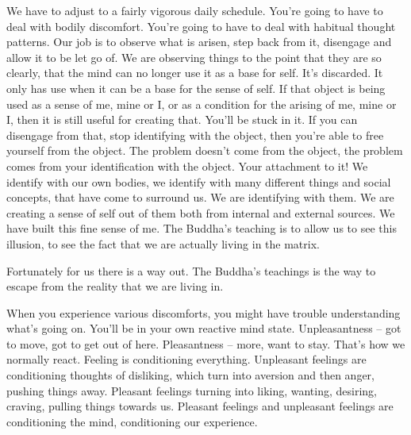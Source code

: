 \documentclass[letterpaper,10pt,english]{sphinxmanual}
\begin{document}
\sphinxAtStartPar
We  have  to  adjust  to  a  fairly  vigorous  daily  schedule.  You’re  going
to  have  to  deal  with  bodily  discomfort. You’re  going  to  have  to  deal  with
habitual  thought  patterns.  Our  job  is  to  observe  what  is  arisen,  step  back
from it, disengage and allow it to be let go of. We are observing things to the
point that they are so clearly, that the mind can no longer use it as a base for
self. It’s discarded. It only has use when it can be a base for the sense of self.
If that object is being used as a sense of me, mine or I, or as a condition for
the arising of me, mine or I, then it is still useful for creating that. You’ll be
stuck in it. If you can disengage from that, stop identifying with the object,
then you’re able to free yourself from the object. The problem doesn’t come
from the object, the problem comes from your identification with the object.
Your  attachment  to  it! We  identify  with  our  own  bodies,  we  identify  with
many different things and social concepts, that have come to surround us.
We are identifying with them. We are creating a sense of self out of them
both from internal and external sources. We have built this fine sense of me.
The Buddha’s teaching is to allow us to see this illusion, to see the fact that
we are actually living in the matrix.

\sphinxAtStartPar
Fortunately  for  us  there  is  a  way  out. The  Buddha’s  teachings  is  the
way to escape from the reality that we are living in.

\sphinxAtStartPar
When  you  experience  various  discomforts,  you  might  have  trouble
understanding what’s going on. You’ll be in your own reactive mind state.
Unpleasantness – got to move, got to get out of here. Pleasantness – more,
want  to  stay.  That’s  how  we  normally  react.
Feeling
is  conditioning  everything.  Unpleasant  feelings  are  conditioning  thoughts
of disliking, which turn into aversion and then anger, pushing things away.
Pleasant  feelings  turning  into  liking,  wanting,  desiring,  craving,  pulling
things towards us. Pleasant feelings and unpleasant feelings are conditioning the mind, conditioning our experience.
\end{document}
